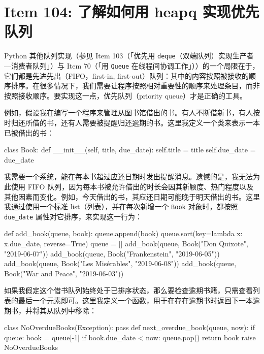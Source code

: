\section{Item 104: 了解如何用 heapq 实现优先队列}

Python 其他队列实现（参见 Item 103（「优先用 \texttt{deque}（双端队列）实现生产者—消费者队列」）与 Item 70（「用 \texttt{Queue} 在线程间协调工作」））的一个局限在于，它们都是先进先出（FIFO，first-in, first-out）队列：其中的内容按照被接收的顺序排序。在很多情况下，我们需要让程序按照相对重要性的顺序来处理条目，而非按照接收顺序。要实现这一点，优先队列（priority queue）才是正确的工具。

例如，假设我在编写一个程序来管理从图书馆借出的书。有人不断借新书，有人按时归还所借的书，还有人需要被提醒归还逾期的书。这里我定义一个类来表示一本已被借出的书：

\begin{codebox}[python]
class Book:
    def __init__(self, title, due_date):
        self.title = title
        self.due_date = due_date
\end{codebox}

我需要一个系统，能在每本书超过应还日期时发出提醒消息。遗憾的是，我无法为此使用 FIFO 队列，因为每本书被允许借出的时长会因其新颖度、热门程度以及其他因素而变化。例如，今天借出的书，其应还日期可能晚于明天借出的书。这里我通过使用一个标准 list（列表），并在每次新增一个 \texttt{Book} 对象时，都按照 \texttt{due\_date} 属性对它排序，来实现这一行为：

\begin{codebox}[python]
def add_book(queue, book):
    queue.append(book)
    queue.sort(key=lambda x: x.due_date, reverse=True)
queue = []
add_book(queue, Book("Don Quixote", "2019-06-07"))
add_book(queue, Book("Frankenstein", "2019-06-05"))
add_book(queue, Book("Les Misérables", "2019-06-08"))
add_book(queue, Book("War and Peace", "2019-06-03"))
\end{codebox}

如果我假定这个借书队列始终处于已排序状态，那么要检查逾期书籍，只需查看列表的最后一个元素即可。这里我定义一个函数，用于在存在逾期书时返回下一本逾期书，并将其从队列中移除：

\begin{codebox}[python]
class NoOverdueBooks(Exception):
    pass
def next_overdue_book(queue, now):
    if queue:
        book = queue[-1]
        if book.due_date < now:
            queue.pop()
            return book
    raise NoOverdueBooks
\end{codebox}

